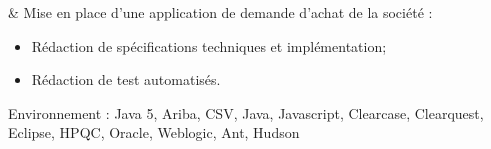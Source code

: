 
			 & Mise en place d'une application de demande d'achat de la société :%
\begin{itemize}%
    \item Rédaction de spécifications techniques et implémentation;%
    \item Rédaction de test automatisés.%
\end{itemize}%
Environnement : Java 5, Ariba, CSV, Java, Javascript, Clearcase, Clearquest, Eclipse, HPQC, Oracle, Weblogic, Ant, Hudson